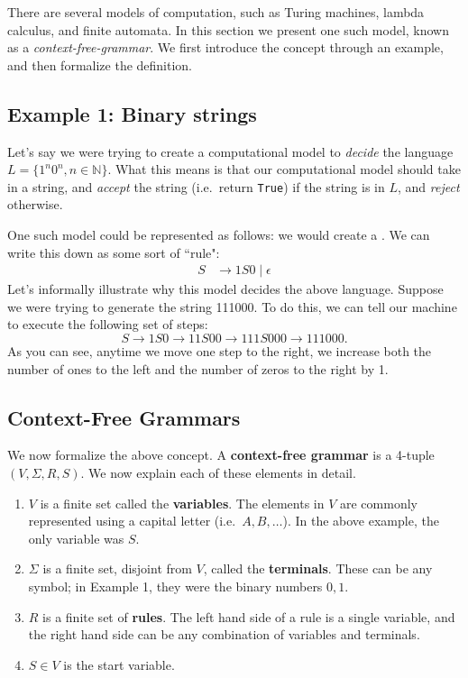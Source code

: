 \documentclass{article}
\begin{document}
    \vspace{3mm}
    There are several models of computation, such as Turing machines, lambda calculus, and finite automata. In this section we present one such model, known as a \textit{context-free-grammar}. We first introduce the concept through an example, and then formalize the definition.
    
\subsection*{Example 1: Binary strings}
    Let's say we were trying to create a computational model to \textit{decide} the language $L = \{1^{n}0^{n}, n \in \mathbb{N}\}$. What this means is that our computational model should take in a string, and \textit{accept} the string (i.e.\ return \texttt{True}) if the string is in $L$, and \textit{reject} otherwise.

    \vspace{2mm}
    One such model could be represented as follows: we would create a . We can write this down as some sort of ``rule":
    \begin{align*}
        S &\rightarrow 1S0 \mid \epsilon
    \end{align*}
    Let's informally illustrate why this model decides the above language. Suppose we were trying to generate the string 111000. To do this, we can tell our machine to execute the following set of steps:
    $$S \rightarrow 1S0 \rightarrow 11S00 \rightarrow 111S000 \rightarrow 111000.$$
    As you can see, anytime we move one step to the right, we increase both the number of ones to the left and the number of zeros to the right by 1.

\subsection*{Context-Free Grammars}
    We now formalize the above concept. A \textbf{context-free grammar} is a 4-tuple $(V, \Sigma, R, S)$. We now explain each of these elements in detail.
    \begin{enumerate}[label = \arabic*.]
        \item $V$ is a finite set called the \textbf{variables}. The elements in $V$ are commonly represented using a capital letter (i.e.\ $A, B, \dots$). In the above example, the only variable was $S$.
        \item $\Sigma$ is a finite set, disjoint from $V$, called the \textbf{terminals}. These can be any symbol; in Example 1, they were the binary numbers $0, 1$.
        \item $R$ is a finite set of \textbf{rules}. The left hand side of a rule is a single variable, and the right hand side can be any combination of variables and terminals.
        \item $S \in V$ is the start variable.
    \end{enumerate}
\end{document}
